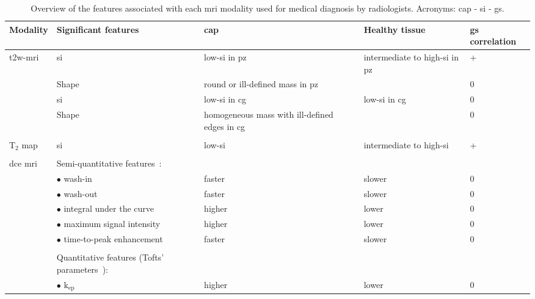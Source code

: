 \begin{landscape}
\begin{table}
  \scriptsize
    \caption{Overview of the features associated with each \acs*{mri} modality used for medical diagnosis by radiologists. Acronyms: \acf{cap} - \acf{si} - \acf{gs}.}\label{tab:modmri}
    \begin{threeparttable}
      \centering
      \noindent
      \begin{tabularx}{\linewidth}{@{} l X X X l @{}}
        \toprule
        \textbf{Modality} & \textbf{Significant features} & \textbf{\acs*{cap}} & \textbf{Healthy tissue} & \textbf{\acs*{gs} correlation} \\
        \midrule
        \acs*{t2w}-\acs*{mri} & \acs*{si} & low-\acs*{si} in \acs*{pz}~\cite{Hricak1987} & intermediate to high-\acs*{si} in \acs*{pz}~\cite{Hricak1987} & +~\cite{Wang2008} \\ 
        & Shape & round or ill-defined mass in \acs*{pz}~\cite{Hricak1983} &  & 0 \\
        & \acs*{si} & low-\acs*{si} in \acs*{cg}~\cite{Akin2006,Barentsz2012} & low-\acs*{si} in \acs*{cg}~\cite{Akin2006,Barentsz2012} & 0 \\
        & Shape & homogeneous mass with ill-defined edges in \acs*{cg}~\cite{Akin2006, Barentsz2012} &  & 0 \\ \\
        T$_2$ map & \acs*{si} & low-\acs*{si}~\cite{Liney1996,Gibbs2001} & intermediate to high-\acs*{si}~\cite{Liney1996,Gibbs2001} & +~\cite{Liu2011,Liney1996,Liney1997}  \\ \\
        \acs*{dce} \acs*{mri} & Semi-quantitative features~\cite{Verma2012}: & & & \\
        & $\bullet$ wash-in & faster & slower & 0 \\
        & $\bullet$ wash-out & faster & slower & 0 \\
        & $\bullet$ integral under the curve & higher & lower & 0 \\
        & $\bullet$ maximum signal intensity & higher & lower & 0 \\
        & $\bullet$ time-to-peak enhancement & faster & slower & 0 \\ \\
        & Quantitative features (Tofts' parameters~\cite{Tofts2010}): & & & \\
        & $\bullet$ $\text{k}_{\text{ep}}$ & higher & lower & 0 \\

\end{tabularx}
\end{threeparttable}
\end{table}
\end{landscape}
